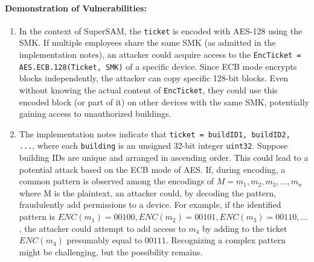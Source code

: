\documentclass[12pt]{article}
\begin{document}
    \paragraph{Demonstration of Vulnerabilities:}
    \begin{enumerate}
        \item In the context of SuperSAM, the \texttt{ticket} is encoded with AES-128 using the SMK. If multiple employees share the same SMK (as admitted in the implementation notes), an attacker could acquire access to the \texttt{EncTicket = AES.ECB.128(Ticket, SMK)} of a specific device. Since ECB mode encrypts blocks independently, the attacker can copy specific 128-bit blocks. Even without knowing the actual content of \texttt{EncTicket}, they could use this encoded block (or part of it) on other devices with the same SMK, potentially gaining access to unauthorized buildings.

        \item The implementation notes indicate that \texttt{ticket = buildID1, buildID2, ...}, where each \texttt{building} is an unsigned 32-bit integer \texttt{uint32}. Suppose building IDs are unique and arranged in ascending order. This could lead to a potential attack based on the ECB mode of AES. If, during encoding, a common pattern is observed among the encodings of $M=m_1, m_2, m_3, ..., m_n$ where M is the plaintext, an attacker could, by decoding the pattern, fraudulently add permissions to a device. For example, if the identified pattern is $ENC(m_1)=00100, ENC(m_2)=00101, ENC(m_3)=00110, ...$, the attacker could attempt to add access to $m_4$ by adding to the ticket $ENC(m_4)$ presumably equal to $00111$. Recognizing a complex pattern might be challenging, but the possibility remains.
    \end{enumerate}
\end{document}
